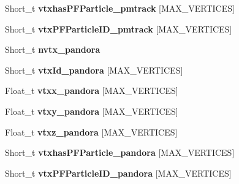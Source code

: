 \begin{DoxyCompactItemize}
\item 
\hypertarget{classanatree_a401d11b726242649173a75d0d13a00ac}{Short\-\_\-t {\bfseries vtxhas\-P\-F\-Particle\-\_\-pmtrack} \mbox{[}M\-A\-X\-\_\-\-V\-E\-R\-T\-I\-C\-E\-S\mbox{]}}\label{classanatree_a401d11b726242649173a75d0d13a00ac}

\item 
\hypertarget{classanatree_a9532423e7e4c050a587f1ec3eeaa2def}{Short\-\_\-t {\bfseries vtx\-P\-F\-Particle\-I\-D\-\_\-pmtrack} \mbox{[}M\-A\-X\-\_\-\-V\-E\-R\-T\-I\-C\-E\-S\mbox{]}}\label{classanatree_a9532423e7e4c050a587f1ec3eeaa2def}

\item 
\hypertarget{classanatree_a7c05547f4a8b01e49426ef990664752a}{Short\-\_\-t {\bfseries nvtx\-\_\-pandora}}\label{classanatree_a7c05547f4a8b01e49426ef990664752a}

\item 
\hypertarget{classanatree_ac9363722862108c4539de33bc14990f2}{Short\-\_\-t {\bfseries vtx\-Id\-\_\-pandora} \mbox{[}M\-A\-X\-\_\-\-V\-E\-R\-T\-I\-C\-E\-S\mbox{]}}\label{classanatree_ac9363722862108c4539de33bc14990f2}

\item 
\hypertarget{classanatree_ae702221266aaf398574e6c0a4b956e41}{Float\-\_\-t {\bfseries vtxx\-\_\-pandora} \mbox{[}M\-A\-X\-\_\-\-V\-E\-R\-T\-I\-C\-E\-S\mbox{]}}\label{classanatree_ae702221266aaf398574e6c0a4b956e41}

\item 
\hypertarget{classanatree_a3ada5e38c3707cf6b65ded5d0aed1be5}{Float\-\_\-t {\bfseries vtxy\-\_\-pandora} \mbox{[}M\-A\-X\-\_\-\-V\-E\-R\-T\-I\-C\-E\-S\mbox{]}}\label{classanatree_a3ada5e38c3707cf6b65ded5d0aed1be5}

\item 
\hypertarget{classanatree_a526781b4d6a3cf93890c000047381e8b}{Float\-\_\-t {\bfseries vtxz\-\_\-pandora} \mbox{[}M\-A\-X\-\_\-\-V\-E\-R\-T\-I\-C\-E\-S\mbox{]}}\label{classanatree_a526781b4d6a3cf93890c000047381e8b}

\item 
\hypertarget{classanatree_aa870ef7aa82c721a5711a6ffae151c53}{Short\-\_\-t {\bfseries vtxhas\-P\-F\-Particle\-\_\-pandora} \mbox{[}M\-A\-X\-\_\-\-V\-E\-R\-T\-I\-C\-E\-S\mbox{]}}\label{classanatree_aa870ef7aa82c721a5711a6ffae151c53}

\item 
\hypertarget{classanatree_a922454b767d4b26fcba1d0af5f3761b4}{Short\-\_\-t {\bfseries vtx\-P\-F\-Particle\-I\-D\-\_\-pandora} \mbox{[}M\-A\-X\-\_\-\-V\-E\-R\-T\-I\-C\-E\-S\mbox{]}}\label{classanatree_a922454b767d4b26fcba1d0af5f3761b4}


\end{DoxyCompactItemize}
